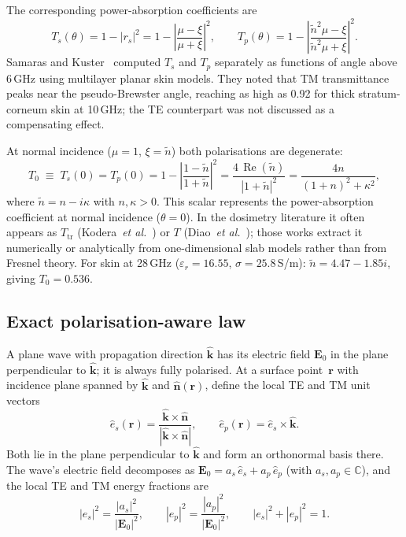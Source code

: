 \documentclass[11pt,a4paper]{article}
\theoremstyle{definition}      %
\newcommand{\khat}{\hat{\bm{k}}}
\newcommand{\nhat}{\hat{\bm{n}}}
\newcommand{\rr}{\mathbf{r}}
\newcommand{\EE}{\mathbf{E}}
\newcommand{\ntilde}{\tilde{n}}
\DeclareMathOperator{\RE}{Re}
\begin{document}
The corresponding power-absorption coefficients are
\begin{equation}\label{eq:Ts-Tp}
  T_s(\theta) = 1 - |r_s|^2
  = 1 - \left|\frac{\mu-\xi}{\mu+\xi}\right|^2, \qquad
  T_p(\theta) = 1 - \left|\frac{\ntilde^2\mu-\xi}{\ntilde^2\mu+\xi}\right|^2.
\end{equation}
Samaras and Kuster~\cite{Samaras2019} computed $T_s$ and $T_p$ separately
as functions of angle above 6\,GHz using multilayer planar skin models.
They noted that TM transmittance peaks near the pseudo-Brewster angle,
reaching as high as 0.92 for thick stratum-corneum skin at 10\,GHz; the
TE counterpart was not discussed as a compensating effect.

At normal incidence ($\mu=1$, $\xi=\ntilde$) both polarisations are
degenerate:
\begin{equation}\label{eq:T0}
  T_0 \;\equiv\; T_s(0) = T_p(0)
  = 1 - \left|\frac{1-\ntilde}{1+\ntilde}\right|^2
  = \frac{4\,\RE(\ntilde)}{|1+\ntilde|^2}
  = \frac{4n}{(1+n)^2+\kappa^2},
\end{equation}
where $\ntilde = n - i\kappa$ with $n,\kappa>0$.
This scalar represents the power-absorption coefficient at normal incidence ($\theta=0$).
In the dosimetry literature it often appears as $T_{\mathrm{tr}}$
(Kodera~\textit{et al.}~\cite{Kodera2024}) or
$T$ (Diao~\textit{et al.}~\cite{Diao2021,Diao2024}); those works extract it
numerically or analytically from one-dimensional slab models rather than from Fresnel theory.
For skin at 28\,GHz ($\varepsilon_r=16.55$, $\sigma=25.8$\,S/m): $\ntilde=4.47-1.85i$, giving
$T_0=0.536$.

\subsection{Exact polarisation-aware law}\label{sec:exact-pol}

A plane wave with propagation direction $\khat$ has its electric field
$\EE_0$ in the plane perpendicular to $\khat$; it is always fully
polarised.  At a surface point~$\rr$ with incidence
plane spanned by $\khat$ and $\nhat(\rr)$, define the local TE and TM
unit vectors
\begin{equation}\label{eq:es-ep}
  \hat{e}_s(\rr) = \frac{\khat\times\nhat}{|\khat\times\nhat|},
  \qquad
  \hat{e}_p(\rr) = \hat{e}_s\times\khat.
\end{equation}
Both lie in the plane perpendicular to $\khat$ and form an orthonormal
basis there.  The wave's electric field decomposes as
$\EE_0 = a_s\,\hat{e}_s + a_p\,\hat{e}_p$ (with $a_s, a_p \in \mathbb{C}$), and the local TE and TM
energy fractions are
\begin{equation}
  |e_s|^2 = \frac{|a_s|^2}{|\EE_0|^2}, \qquad
  |e_p|^2 = \frac{|a_p|^2}{|\EE_0|^2}, \qquad
  |e_s|^2 + |e_p|^2 = 1.
\end{equation}
\end{document}
